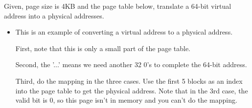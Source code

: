 \begin{frame}[fragile]
\begin{tcolorbox}[enhanced,attach boxed title to top center={yshift=-3mm,yshifttext=-1mm},
  colback=red!5!white,colframe=red!75!black,colbacktitle=red!80!black,
  title=Try this,fonttitle=\bfseries,
  boxed title style={size=small,colframe=red!50!black} ]
Given, page size is 4KB and the page table below, translate a 64-bit virtual address into a physical addresses.   
\end{tcolorbox}
\BNotes\ifnum{}
\begin{itemize}
\item This is an example of converting a virtual address to a physical address.

	First, note that this is only a small part of the page table.

	Second, the '...' means we need another 32 0's to complete the 64-bit
	address.

	Third, do the mapping in the three cases.  Use the first 5 blocks
	as an index into the page table to get the physical address.  Note
	that in the 3rd case, the valid bit is 0, so this page isn't in memory
	and you can't do the mapping.
\end{itemize}
\fi\ENotes
\end{frame}

